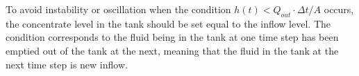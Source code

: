 To avoid instability or oscillation when the condition $h(t) < Q_{out}\cdot \Delta t / A$ occurs, the concentrate level in the tank should be set equal to the inflow level. The condition corresponds to the fluid being in the tank at one time step has been emptied out of the tank at the next, meaning that the fluid in the tank at the next time step is new inflow.  



